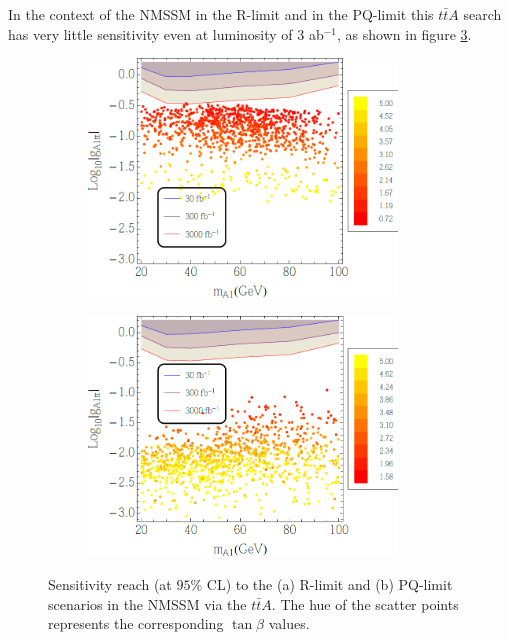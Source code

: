 In the context of the NMSSM in the R-limit \cite{Espinosa:1992sk} and in the PQ-limit \cite{Schuster:2005py} this $t\bar{t}A$ search has very little sensitivity even at luminosity of 3 ab$^{-1}$, as shown in figure \ref{sec:ttA:fig:nmssm}.


\begin{figure}[htb!]
\centering
\begin{subfigure}{0.45\textwidth}
  \centering
  \includegraphics[width=0.9\textwidth]{figures/ttA/fig8a.png}
  \caption{}
  \label{}
\end{subfigure}
\begin{subfigure}{0.45\textwidth}
  \centering
  \includegraphics[width=0.9\textwidth]{figures/ttA/fig9a.png}
  \caption{}
  \label{}
\end{subfigure}
\captionsetup{width=0.85\textwidth} \caption{\small Sensitivity reach (at $95\%$ CL) to the (a) R-limit and (b) PQ-limit scenarios in the NMSSM via the $t\bar{t}A$. The hue of the scatter points represents the corresponding $\tan\beta$ values. }
\label{sec:ttA:fig:nmssm}
\end{figure}